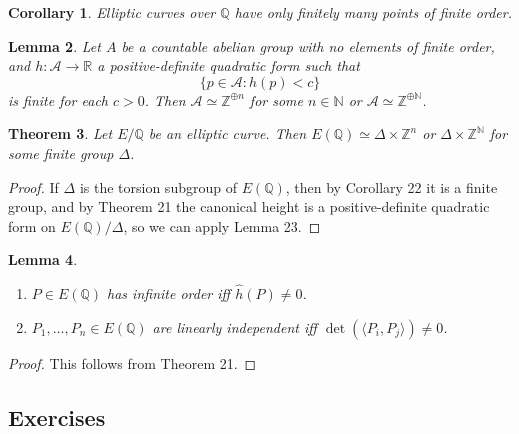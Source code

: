 \documentclass[a4paper]{article}
\theoremstyle{plain}
\newtheorem{theorem}{Theorem}
\newtheorem{lemma}[theorem]{Lemma}
\newtheorem{corollary}[theorem]{Corollary}
\theoremstyle{remark}
\theoremstyle{definition}
\newcommand{\A}{\mathcal{A}}
\newcommand{\N}{\mathbb{N}}
\newcommand{\Z}{\mathbb{Z}}
\newcommand{\Q}{\mathbb{Q}}
\newcommand{\R}{\mathbb{R}}
\begin{document}
\begin{corollary}
    Elliptic curves over $\Q$ have only finitely many points of finite order.
\end{corollary}

\begin{lemma}
    Let $A$ be a countable abelian group with no elements of finite order, and
    $h:\A\to\R$ a positive-definite quadratic form such that
    \begin{equation*}
        \{p\in\A:h(p)<c\}
    \end{equation*}
    is finite for each $c>0$. Then $\A\simeq\Z^{\oplus n}$ for some $n\in\N$ or
    $\A\simeq\Z^{\oplus\N}$.
\end{lemma}

\begin{theorem}
    Let $E/\Q$ be an elliptic curve. Then $E(\Q)\simeq\Delta\times\Z^n$ or
    $\Delta\times\Z^\N$ for some finite group $\Delta$.
\end{theorem}

\begin{proof}
    If $\Delta$ is the torsion subgroup of $E(\Q)$, then by Corollary 22 it is a
    finite group, and by Theorem 21 the canonical height is a positive-definite
    quadratic form on $E(\Q)/\Delta$, so we can apply Lemma 23.
\end{proof}

\begin{lemma}
    ~
    \begin{enumerate}[label=(\roman*)]
        \item $P\in E(\Q)$ has infinite order iff $\hat h(P)\ne0$.
        \item $P_1,\ldots,P_n\in E(\Q)$ are linearly independent iff
            $\det(\langle P_i,P_j\rangle)\ne0$.
    \end{enumerate}
\end{lemma}

\begin{proof}
    This follows from Theorem 21.
\end{proof}

\subsection*{Exercises}
\end{document}
